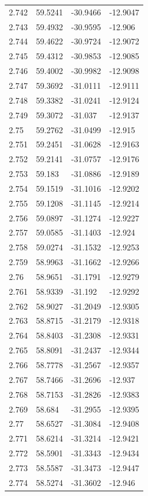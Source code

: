 \begin{tabular}{llll}
2.742 & 59.5241 & -30.9466 & -12.9047 \\
2.743 & 59.4932 & -30.9595 & -12.906 \\
2.744 & 59.4622 & -30.9724 & -12.9072 \\
2.745 & 59.4312 & -30.9853 & -12.9085 \\
2.746 & 59.4002 & -30.9982 & -12.9098 \\
2.747 & 59.3692 & -31.0111 & -12.9111 \\
2.748 & 59.3382 & -31.0241 & -12.9124 \\
2.749 & 59.3072 & -31.037 & -12.9137 \\
2.75 & 59.2762 & -31.0499 & -12.915 \\
2.751 & 59.2451 & -31.0628 & -12.9163 \\
2.752 & 59.2141 & -31.0757 & -12.9176 \\
2.753 & 59.183 & -31.0886 & -12.9189 \\
2.754 & 59.1519 & -31.1016 & -12.9202 \\
2.755 & 59.1208 & -31.1145 & -12.9214 \\
2.756 & 59.0897 & -31.1274 & -12.9227 \\
2.757 & 59.0585 & -31.1403 & -12.924 \\
2.758 & 59.0274 & -31.1532 & -12.9253 \\
2.759 & 58.9963 & -31.1662 & -12.9266 \\
2.76 & 58.9651 & -31.1791 & -12.9279 \\
2.761 & 58.9339 & -31.192 & -12.9292 \\
2.762 & 58.9027 & -31.2049 & -12.9305 \\
2.763 & 58.8715 & -31.2179 & -12.9318 \\
2.764 & 58.8403 & -31.2308 & -12.9331 \\
2.765 & 58.8091 & -31.2437 & -12.9344 \\
2.766 & 58.7778 & -31.2567 & -12.9357 \\
2.767 & 58.7466 & -31.2696 & -12.937 \\
2.768 & 58.7153 & -31.2826 & -12.9383 \\
2.769 & 58.684 & -31.2955 & -12.9395 \\
2.77 & 58.6527 & -31.3084 & -12.9408 \\
2.771 & 58.6214 & -31.3214 & -12.9421 \\
2.772 & 58.5901 & -31.3343 & -12.9434 \\
2.773 & 58.5587 & -31.3473 & -12.9447 \\
2.774 & 58.5274 & -31.3602 & -12.946 \\

\end{tabular}
